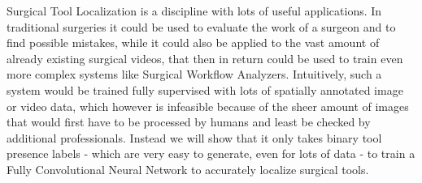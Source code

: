 Surgical Tool Localization is a discipline with lots of useful applications. In traditional surgeries it could be used to evaluate the work of a surgeon and to find possible mistakes, while it could also be applied to the vast amount of already existing surgical videos, that then in return could be used to train even more complex systems like Surgical Workflow Analyzers. Intuitively, such a system would be trained fully supervised with lots of spatially annotated image or video data, which however is infeasible because of the sheer amount of images that would first have to be processed by humans and least be checked by additional professionals. Instead we will show that it only takes binary tool presence labels - which are very easy to generate, even for lots of data - to train a Fully Convolutional Neural Network to accurately localize surgical tools.